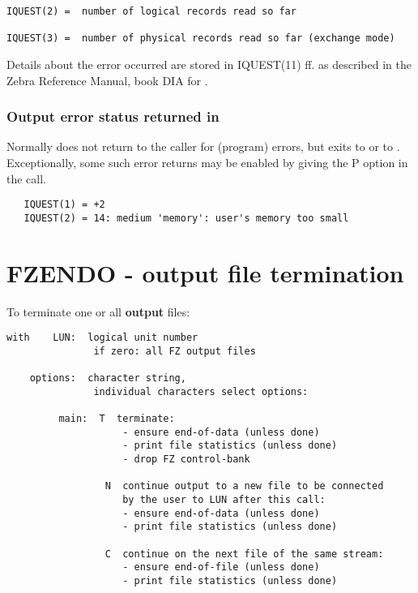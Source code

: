 {\begin{verbatim}
IQUEST(2) =  number of logical records read so far

IQUEST(3) =  number of physical records read so far (exchange mode)
\end{verbatim}
Details about the error occurred are stored in IQUEST(11) ff.
as described in the Zebra Reference Manual, book DIA for .

\subsubsection*{Output error status returned in }

Normally  does not return to the caller for (program) errors,
but exits to  or to . 
Exceptionally, some such error
returns may be enabled by giving the P option in the call.

\begin{verbatim}
   IQUEST(1) = +2
   IQUEST(2) = 14: medium 'memory': user's memory too small
\end{verbatim}

\section{FZENDO - output file termination}

To terminate one or all \textbf{output} files:


\begin{verbatim}
with    LUN:  logical unit number
               if zero: all FZ output files

    options:  character string,
               individual characters select options:

         main:  T  terminate:
                    - ensure end-of-data (unless done)
                    - print file statistics (unless done)
                    - drop FZ control-bank

                 N  continue output to a new file to be connected
                    by the user to LUN after this call:
                    - ensure end-of-data (unless done)
                    - print file statistics (unless done)

                 C  continue on the next file of the same stream:
                    - ensure end-of-file (unless done)
                    - print file statistics (unless done)


\end{verbatim}}
